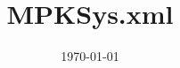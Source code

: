 \documentclass[11pt,a4paper]{article}
\begin{document}
\title{MPKSys.xml}
\date{\today}
\maketitle


\end{document}
